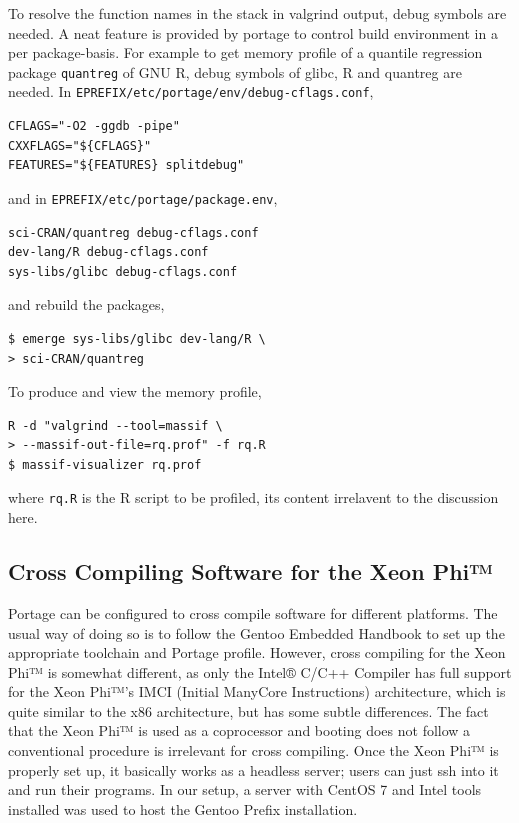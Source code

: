 \documentclass[a4paper,conference]{IEEEtran}
\begin{document}
To resolve the function names in the stack in valgrind output, debug
symbols are needed.  A neat feature is provided by portage to control
build environment in a per package-basis.  For example to get memory
profile of a quantile regression package \texttt{quantreg} of GNU R,
debug symbols of glibc, R and quantreg are needed. In
\texttt{EPREFIX/etc/portage/env/debug-cflags.conf},
\begin{verbatim}
CFLAGS="-O2 -ggdb -pipe"
CXXFLAGS="${CFLAGS}"
FEATURES="${FEATURES} splitdebug"
\end{verbatim}
and in \texttt{EPREFIX/etc/portage/package.env},
\begin{verbatim}
sci-CRAN/quantreg debug-cflags.conf
dev-lang/R debug-cflags.conf
sys-libs/glibc debug-cflags.conf
\end{verbatim}
and rebuild the packages,
\begin{verbatim}
$ emerge sys-libs/glibc dev-lang/R \
> sci-CRAN/quantreg
\end{verbatim}

To produce and view the memory profile,
\begin{verbatim}
R -d "valgrind --tool=massif \
> --massif-out-file=rq.prof" -f rq.R
$ massif-visualizer rq.prof
\end{verbatim}
where \texttt{rq.R} is the R script to be profiled, its content
irrelavent to the discussion here.

\subsection{Cross Compiling Software for the Xeon Phi™}

Portage can be configured to cross compile software for different
platforms. The usual way of doing so is to follow the Gentoo Embedded
Handbook \cite{gentoo:embedded} to set up the appropriate toolchain and
Portage profile. However, cross compiling for the Xeon Phi™ is somewhat
different, as only the Intel® C/C++ Compiler has full support for the
Xeon Phi™'s IMCI (Initial ManyCore Instructions) architecture, which is
quite similar to the x86 architecture, but has some subtle differences.
The fact that the Xeon Phi™ is used as a coprocessor and booting does
not follow a conventional procedure is irrelevant for cross compiling.
Once the Xeon Phi™ is properly set up, it basically works as a headless
server; users can just ssh into it and run their programs. In our setup,
a server with CentOS 7 and Intel tools installed was used to host the
Gentoo Prefix installation.
\end{document}
